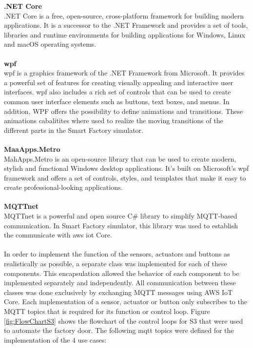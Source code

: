 \textbf{.NET Core}
\\
.NET Core is a free, open-source, cross-platform framework for building modern applications. 
It is a successor to the .NET Framework and provides a set of tools, libraries and runtime environments for building applications for Windows, Linux and macOS operating systems.
\\
\\
\textbf{\ac{wpf}}
\\
\ac{wpf} is a graphics framework of the .NET Framework from Microsoft. 
It provides a powerful set of features for creating visually appealing and interactive user interfaces. \ac{wpf} also includes a rich set of controls that can be used to create common user interface elements such as buttons, text boxes, and menus. 
In addition, WPF offers the possibility to define animations and transitions. 
These animations cabalitites where used to realize the moving transitions of the different parts in the Smart Factory simulator.
\\
\\
\textbf{MaaApps.Metro}
\\
MahApps.Metro is an open-source library that can be used to create modern, stylish and functional Windows desktop applications. 
It's built on Microsoft's \ac{wpf} framework and offers a set of controls, styles, and templates that make it easy to create professional-looking applications.
\\
\\
\textbf{MQTTnet}
\\
MQTTnet is a powerful and open source C\# library to simplify MQTT-based communication. 
In Smart Factory simulator, this library was used to establish the communicate with \ac{aws} \ac{iot} Core.
\\
\\
In order to implement the function of the sensors, actuators and buttons as realistically as possible, a separate class was implemented for each of these components. 
This encapsulation allowed the behavior of each component to be implemented separately and independently. 
All communication between these classes was done exclusively by exchanging MQTT messages using AWS IoT Core. 
Each implementation of a sensor, actuator or button only subscribes to the MQTT topics that is required for its function or control loop. Figure \ref{fig:FlowChartS3} shows the flowchart of the control loops for S3 that were used to automate the factory door. The following \ac{mqtt} topics were defined for the implementation of the 4 use cases:

